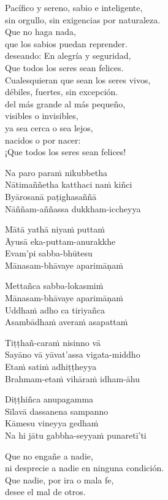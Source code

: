 Pacífico y sereno, sabio e inteligente,\\
sin orgullo, sin exigencias por naturaleza.\\
Que no haga nada,\\
que los sabios puedan reprender.\\
deseando: En alegría y seguridad,\\
Que todos los seres sean felices.\\
Cualesquieran que sean los seres vivos,\\
débiles, fuertes, sin excepción.\\
del más grande al más pequeño,\\
visibles o invisibles,\\
ya sea cerca o sea lejos,\\
nacidos o por nacer: \\
¡Que todos los seres sean felices!

\clearpage

Na paro paraṁ nikubbetha\\
Nātimaññetha katthaci naṁ kiñci\\
Byārosanā paṭighasaññā\\
Nāññam-aññassa dukkham-iccheyya

Mātā yathā niyaṁ puttaṁ\\
Āyusā eka-puttam-anurakkhe\\
Evam'pi sabba-bhūtesu\\
Mānasam-bhāvaye aparimāṇaṁ

Mettañca sabba-lokasmiṁ\\
Mānasam-bhāvaye aparimāṇaṁ\\
Uddhaṁ adho ca tiriyañca\\
Asambādhaṁ averaṁ asapattaṁ

Tiṭṭhañ-caraṁ nisinno vā\\
Sayāno vā yāvat'assa vigata-middho\\
Etaṁ satiṁ adhiṭṭheyya\\
Brahmam-etaṁ vihāraṁ idham-āhu

Diṭṭhiñca anupagamma\\
Sīlavā dassanena sampanno\\
Kāmesu vineyya gedhaṁ\\
Na hi jātu gabbha-seyyaṁ punaretī'ti

\clearpage

Que no engañe a nadie,\\
ni desprecie a nadie en ninguna condición.\\
Que nadie, por ira o mala fe,\\
desee el mal de otros.

